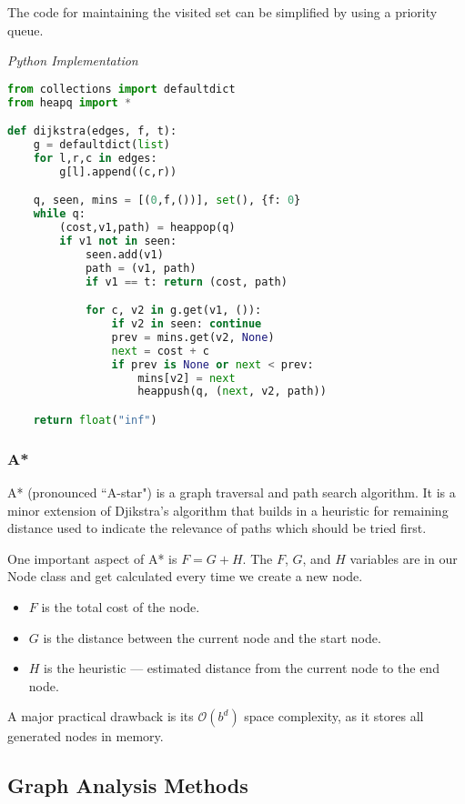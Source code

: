 \documentclass{article}
\newcommand{\bigO}{\ensuremath{\mathcal{O}}}
\begin{document}
    The code for maintaining the visited set can be simplified by using a priority queue.
    
\vspace{8pt} \emph{Python Implementation}
\begin{lstlisting}[language=Python]
from collections import defaultdict
from heapq import *

def dijkstra(edges, f, t):
    g = defaultdict(list)
    for l,r,c in edges:
        g[l].append((c,r))

    q, seen, mins = [(0,f,())], set(), {f: 0}
    while q:
        (cost,v1,path) = heappop(q)
        if v1 not in seen:
            seen.add(v1)
            path = (v1, path)
            if v1 == t: return (cost, path)

            for c, v2 in g.get(v1, ()):
                if v2 in seen: continue
                prev = mins.get(v2, None)
                next = cost + c
                if prev is None or next < prev:
                    mins[v2] = next
                    heappush(q, (next, v2, path))

    return float("inf")
\end{lstlisting}

    \subsubsection{A*}
    A* (pronounced ``A-star") is a graph traversal and path search algorithm. It is a minor extension of Djikstra's algorithm that builds in a heuristic for remaining distance used to indicate the relevance of paths which should be tried first.
    
    One important aspect of A* is $F = G + H$. The $F$, $G$, and $H$ variables are in our Node class and get calculated every time we create a new node. 
    \begin{itemize}
        \item $F$ is the total cost of the node.
        \item $G$ is the distance between the current node and the start node.
        \item $H$ is the heuristic — estimated distance from the current node to the end node.
    \end{itemize}
    
    A major practical drawback is its $\bigO(b^d)$ space complexity, as it stores all generated nodes in memory.
   
    
    \subsection{Graph Analysis Methods}
\end{document}
